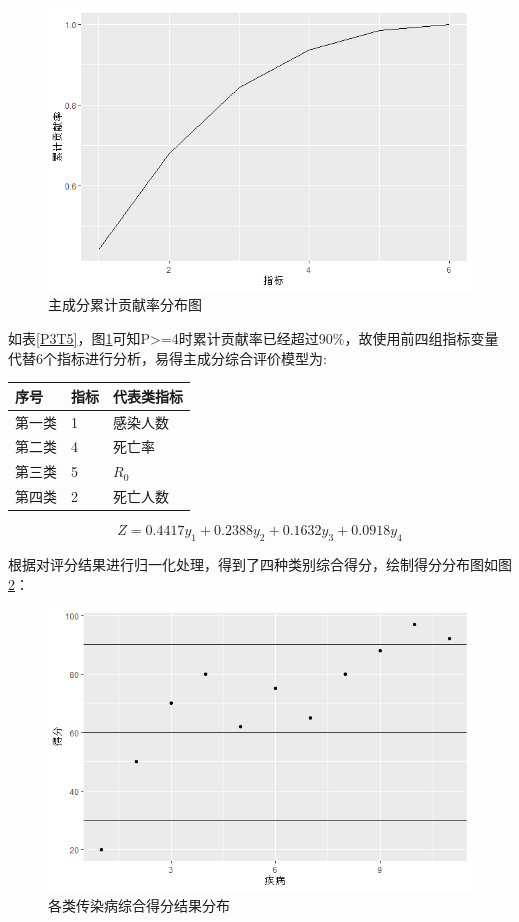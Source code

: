 \documentclass[a4paper, 11pt,twoside=true,UTF8]{scrartcl}
\begin{document}
\begin{figure}[h]
	\small
	\centering
	\includegraphics[width=12cm]{P3F5}
	\caption{主成分累计贡献率分布图} \label{P3F5}
\end{figure}
如表\ref{P3T5}，图\ref{P3F5}可知P>=4时累计贡献率已经超过90\%，故使用前四组指标变量代替6个指标进行分析，易得主成分综合评价模型为:
\begin{table}[H]
	\centering
	\begin{tabular}{lll}
		\hline
		\textbf{序号} & \textbf{指标} & \textbf{代表类指标} \\ \hline
		第一类         & 1           & 感染人数           \\
		第二类         & 4           & 死亡率            \\
		第三类         & 5           & $R_0$             \\
		第四类         & 2           & 死亡人数           \\ \hline
	\end{tabular}
\end{table}
$$
Z=0.4417y_1+0.2388y_2+0.1632y_3+0.0918y_4
$$

根据对评分结果进行归一化处理，得到了四种类别综合得分，绘制得分分布图如图\ref{P3F6}：
\begin{figure}[H]
	\small
	\centering
	\includegraphics[width=12cm]{P3F6}
	\caption{各类传染病综合得分结果分布} \label{P3F6}
\end{figure}
	
\end{document}
